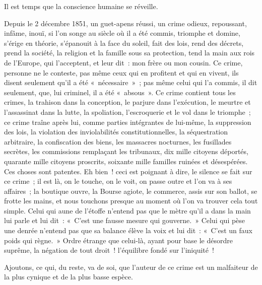 \documentclass[french,twoside]{book} %
\begin{document}
Il est temps que la conscience humaine se réveille.\par
Depuis le 2 décembre 1851, un guet-apens réussi, un crime odieux, repoussant, infâme, inouï, si l’on songe au siècle où il a été commis, triomphe et domine, s’érige en théorie, s’épanouit à la face du soleil, fait des lois, rend des décrets, prend la société, la religion et la famille sous sa protection, tend la main aux rois de l’Europe, qui l’acceptent, et leur dit : mon frère ou mon cousin. Ce crime, personne ne le conteste, pas même ceux qui en profitent et qui en vivent, ils disent seulement qu’il a été « nécessaire » ; pas même celui qui l’a commis, il dit seulement, que, lui criminel, il a été « absous ». Ce crime contient tous les crimes, la trahison dans la conception, le parjure dans l’exécution, le meurtre et l’assassinat dans la lutte, la spoliation, l’escroquerie et le vol dans le triomphe ; ce crime traîne après lui, comme parties intégrantes de lui-même, la suppression des lois, la violation des inviolabilités constitutionnelles, la séquestration arbitraire, la confiscation des biens, les massacres nocturnes, les fusillades secrètes, les commissions remplaçant les tribunaux, dix mille citoyens déportés, quarante mille citoyens proscrits, soixante mille familles ruinées et désespérées. Ces choses sont patentes. Eh bien ! ceci est poignant à dire, le silence se fait sur ce crime ; il est là, on le touche, on le voit, on passe outre et l’on va à ses affaires ; la boutique ouvre, la Bourse agiote, le commerce, assis sur son ballot, se frotte les mains, et nous touchons presque au moment où l’on va trouver cela tout simple. Celui qui aune de l’étoffe n’entend pas que le mètre qu’il a dans la main lui parle et lui dit : « C’est une fausse mesure qui gouverne. » Celui qui pèse une denrée n’entend pas que sa balance élève la voix et lui dit : « C’est un faux poids qui règne. » Ordre étrange que celui-là, ayant pour base le désordre suprême, la négation de tout droit ! l’équilibre fondé sur l’iniquité !\par
Ajoutons, ce qui, du reste, va de soi, que l’auteur de ce crime est un malfaiteur de la plus cynique et de la plus basse espèce.\par
\end{document}
